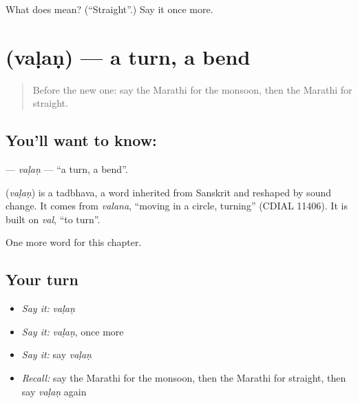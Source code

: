 \begin{tcolorbox}[breakable,colback=teal!4,colframe=teal!35!black,title={Before you move on}]
What does  mean? (\textquotedblleft{}Straight\textquotedblright{}.) Say it once more.
\end{tcolorbox}
\section[\texorpdfstring{\mr{वळण} (vaḷaṇ)}{वळण (vaḷaṇ)}]{ (vaḷaṇ) — a turn, a bend}

\label{lesson:MR-C127-valan}



\begin{quote}
Before the new one: say the Marathi for the monsoon, then the Marathi for straight.
\end{quote}

\subsection*{You'll want to know: }
\textbf{} — \emph{vaḷaṇ} — \textquotedblleft{}a turn, a bend\textquotedblright{}.

\begin{cousinweb}
\textbf{} (\emph{vaḷaṇ}) is a tadbhava, a word inherited from Sanskrit and reshaped by sound change. It comes from \emph{valana}, \textquotedblleft{}moving in a circle, turning\textquotedblright{} (CDIAL 11406). It is built on \emph{val}, \textquotedblleft{}to turn\textquotedblright{}.
\end{cousinweb}

\begin{grammarlens}[title={What you've built}]
One more word for this chapter.
\end{grammarlens}

\subsection*{Your turn}
\begin{itemize}
\raggedright
  \item \emph{Say it:} \emph{vaḷaṇ}
  \item \emph{Say it:} \emph{vaḷaṇ}, once more
  \item \emph{Say it:} say \emph{vaḷaṇ}
  \item \emph{Recall:} say the Marathi for the monsoon, then the Marathi for straight, then say \emph{vaḷaṇ} again
\end{itemize}

